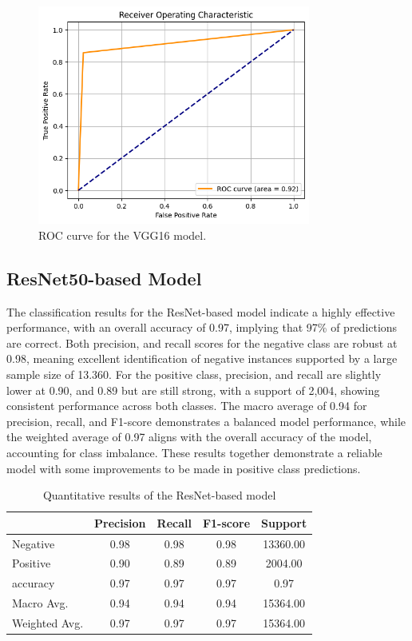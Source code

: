 \documentclass[../main]{subfiles}
\begin{document}
\begin{figure}[h]
	\centering
	\includegraphics[width=0.8\textwidth]{assets/roc_vgg16.png}
	\caption{ROC curve for the VGG16 model.}
	\label{fig:prototype_architecture}
\end{figure}

\subsection{ResNet50-based Model}
The classification results for the ResNet-based model indicate a highly effective performance, with an overall accuracy of 0.97, implying that 97\% of predictions are correct. Both precision, and recall scores for the negative class are robust at 0.98, meaning excellent identification of negative instances supported by a large sample size of 13.360. For the positive class, precision, and recall are slightly lower at 0.90, and 0.89 but are still strong, with a support of 2,004, showing consistent performance across both classes. The macro average of 0.94 for precision, recall, and F1-score demonstrates a balanced model performance, while the weighted average of 0.97 aligns with the overall accuracy of the model, accounting for class imbalance. These results together demonstrate a reliable model with some improvements to be made in positive class predictions.

\begin{table}[h]
    \centering
    \begin{tabular}{|l|c|c|c|c|}
        \hline
         & Precision & Recall & F1-score & Support \\ \hline
        Negative & 0.98 & 0.98 & 0.98 & 13360.00 \\ \hline
        Positive & 0.90 & 0.89 & 0.89 & 2004.00 \\ \hline
        accuracy & 0.97 & 0.97 & 0.97 & 0.97 \\ \hline
        Macro Avg. & 0.94 & 0.94 & 0.94 & 15364.00 \\ \hline
        Weighted Avg. & 0.97 & 0.97 & 0.97 & 15364.00 \\ \hline
    \end{tabular}
    \caption{Quantitative results of the ResNet-based model}
    \label{tab:quantitative-results-resnet}
\end{table}
\end{document}
